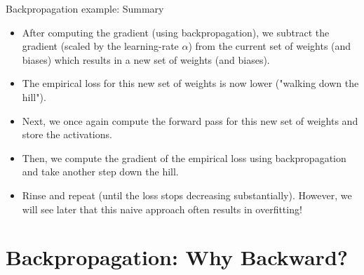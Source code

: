 \begin{frame} {Backpropagation example: Summary}
  \begin{itemize}
    \item After computing the gradient (using backpropagation), we subtract the gradient (scaled by the learning-rate $\alpha$) from the current set of weights (and biases) which results in a new set of weights (and biases).
    \item The empirical loss for this new set of weights is now lower ("walking down the hill").
    \item Next, we once again compute the forward pass for this new set of weights and store the activations.
    \item Then, we compute the gradient of the empirical loss using backpropagation and take another step down the hill.
    \item Rinse and repeat (until the loss stops decreasing substantially). 
      However, we will see later that this naive approach often results in overfitting!
  \end{itemize}
\end{frame}



\section{Backpropagation: Why Backward?}


